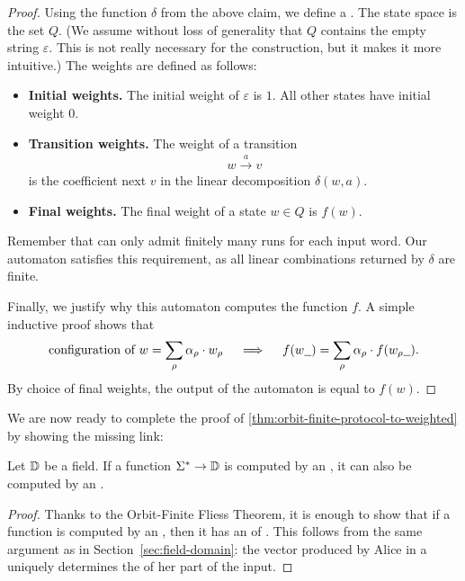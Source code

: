 \begin{proof}
    Using the function $\delta$ from the above claim, we define a . The state space is the set $Q$. (We assume without
    loss of generality that $Q$ contains the empty string $\varepsilon$. This
    is not really necessary for the construction, but it makes it more
    intuitive.) The weights are defined as follows: 
    \begin{itemize}
        \item \textbf{Initial weights.} The initial weight of   $\varepsilon$ is $1$. All other states have initial weight $0$.
        \item \textbf{Transition weights.} The weight of a transition 
        \begin{align*}
        w \xrightarrow{a} v
        \end{align*}
    is the coefficient next $v$ in the linear decomposition $\delta(w,a)$.
        \item \textbf{Final weights.} The final weight of a state $w \in Q$ is $f(w)$.
    \end{itemize}
    Remember that  can only admit finitely many runs for each input word.
    Our automaton satisfies this requirement, as all linear combinations returned by $\delta$ are finite. 

    Finally, we justify why this automaton computes the function $f$. A simple inductive proof shows that  
    \begin{align*}
\text{configuration of $w$} = \sum_\rho \alpha_\rho \cdot w_\rho
\quad \implies \quad 
        f(w\underline{\hspace{2mm}}) = 
    \sum_\rho \alpha_\rho \cdot f(w_\rho\underline{\hspace{2mm}}).
    \end{align*}
    By choice of final weights, the output of the automaton is equal to $f(w)$. 
\end{proof}

We are now ready to complete the proof of \cref{thm:orbit-finite-protocol-to-weighted} by showing the missing link:
\begin{claim}
\label{claim:bilinear-prot-to-of-automaton}
Let $\mathbb D$ be a field.
    If a function $\Sigma^* \to \mathbb D$ is computed by an 
    , it can also be computed by an 
    .
\end{claim}
\begin{proof}
    Thanks to the Orbit-Finite Fliess Theorem,
    it is enough to show that if a function is computed by an , then it has an  of . This follows from the same argument as in Section~\ref{sec:field-domain}:
    the vector produced by Alice in a 
    uniquely determines the  of her part of the input. 
\end{proof}
